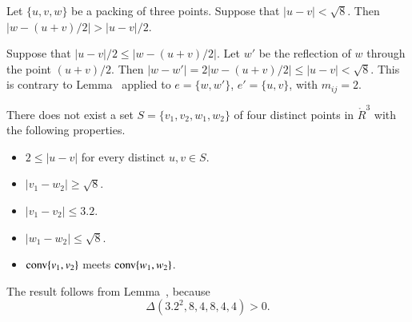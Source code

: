 \begin{tarskidata}
\begin{tarski}

\begin{lemma}
  Let $\{u,v,w\}$ be a packing of three points.  Suppose that 
$|u-v| <\sqrt8$.  Then $|w- (u+v)/2| > |u-v|/2$.
\end{lemma}

\begin{proved} Suppose that $|u-v|/2\le |w-(u+v)/2|$.
Let $w'$ be the reflection of $w$ through the point
$(u+v)/2$.  Then $|w-w'| = 2|w-(u+v)/2|\le |u-v| <\sqrt8$.
This is contrary to Lemma~ applied to
$e=\{w,w'\}$, $e'=\{u,v\}$, with $m_{ij}=2$.  
\swallowed\end{proved}
\end{tarski}







\begin{tarski}

\begin{lemma} 
There does not exist a set
$S=\{v_1,v_2,w_1,w_2\}$ of four distinct points
in $\ring{R}^3$ with the following properties.
\begin{itemize}
	\item $2\le |u-v|$ for every distinct $u,v\in S$.
          \item $|v_1-w_2|\ge \sqrt{8}$.
		\item $ |v_1-v_2| \le 3.2$.
	\item $|w_1-w_2|\le \sqrt{8}$.
	\item ${\operatorname{conv}}\{v_1,v_2\}$ meets
		${\operatorname{conv}}\{w_1,w_2\}$.
\end{itemize}
\end{lemma}


\begin{proved} The result follows from Lemma~,
because
  $$
  \Delta(3.2^2,8,4,8,4,4) > 0.
  $$
\swallowed\end{proved}
\end{tarski}






\end{tarskidata}
